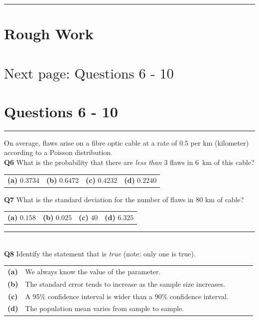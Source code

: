 \documentclass[12pt]{article}
\begin{document}
\quad

\rule{\linewidth}{1pt}

\newpage

\section*{Rough Work\\[23cm]}
\section*{\hspace{8cm}$\boxed{\text{Next page: Questions 6 - 10}}$}

\newpage


\section*{Questions 6 - 10}


\rule{\linewidth}{1pt}
\quad

On average, flaws arise on a fibre optic cable at a rate of $0.5$ per km (kilometer) according to a Poisson distribution.\\[0.2cm]

{\bf Q6} What is the probability that there are \emph{less than} 3 flaws in 6~km of this cable? \\[0.2cm]
\begin{tabular}{cccc}
{\bf(a)} $0.3734$ & {\bf(b)} $0.6472$ & {\bf(c)} $0.4232$ & {\bf(d)} $0.2240$ \\[0.6cm]
\end{tabular}

{\bf Q7} What is the standard deviation for the number of flaws in 80 km of cable?\\[0.2cm]
\begin{tabular}{cccc}
{\bf(a)} $0.158$  & {\bf(b)} $0.025$ & {\bf(c)} $40$  & {\bf(d)} $6.325$ \\[0.6cm]
\end{tabular}


\rule{\linewidth}{1pt}
\quad\\
{\bf Q8} Identify the statement that is \emph{true} (note: only one is true).\\[0.2cm]
\begin{tabular}{c@{\,\,\,}llll}
{\bf(a)} & We always know the value of the parameter. \\[0.2cm]
{\bf(b)} & The standard error tends to increase as the sample size increases. \\[0.2cm]
{\bf(c)} & A 95\% confidence interval is wider than a 90\% confidence interval. \\[0.2cm]
{\bf(d)} & The population mean varies from sample to sample. \\[0.6cm]
\end{tabular}
\end{document}

